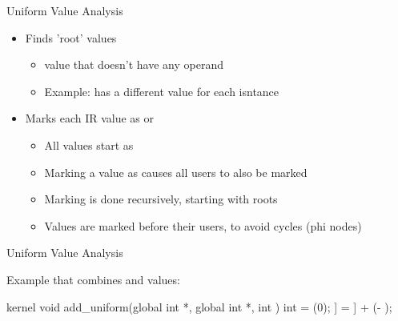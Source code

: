 \begin{frame}{Uniform Value Analysis}

\begin{itemize}
    \item Finds 'root' values
    \begin{itemize}
        \item {} value that doesn't have any  operand
        \item Example:  has a different value for each isntance
    \end{itemize}
    \item Marks each IR value as  or 
    \begin{itemize}
        \item All values start as 
        \item Marking a value as  causes all users to also be marked 
        \item Marking is done recursively, starting with roots
        \item Values are marked before their users, to avoid cycles (phi nodes)
    \end{itemize}
\end{itemize}

\end{frame}


\begin{frame}[fragile]{Uniform Value Analysis}

Example that combines  and  values:

\begin{codebox}[commandchars=\\\[\]]
kernel void add_uniform(global int *\uniform[dst], global int *\uniform[src], int \uniform[alpha]) {
    int \varying[tid] = (0);
    \uniform[dst]\idx[\varying[tid]] = \uniform[src]\idx[\varying[tid]] + (\uniform[alpha] - \uniform[1]);
}
\end{codebox}


\end{frame}

